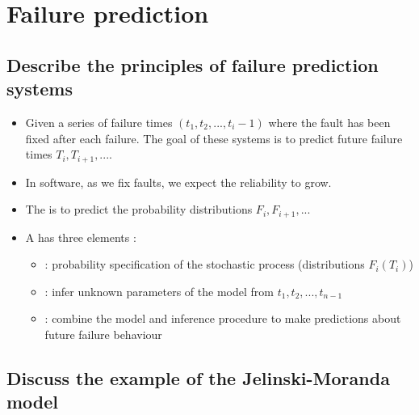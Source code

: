 \chapter{Failure prediction}

\section{Describe the principles of failure prediction systems}

\begin{itemize}
    \item Given a series of failure times $(t_1, t_2, ..., t_i-1)$ where the fault has been fixed after each failure. The goal of these systems is to predict future failure times $T_i, T_{i+1},....$
    \item In software, as we fix faults, we expect the reliability to grow.
    \item The  is to predict the probability distributions $F_i, F_{i+1},...$
    \item A  has three elements :
    \begin{itemize}
        \item {} : probability specification of the stochastic process (distributions $F_i(T_i)$)
        \item {} : infer unknown parameters of the model from $t_1, t_2, ..., t_{n-1}$
        \item {} : combine the model and inference procedure to make predictions about future failure behaviour
    \end{itemize}
\end{itemize}

\section{Discuss the example of the Jelinski-Moranda model}

